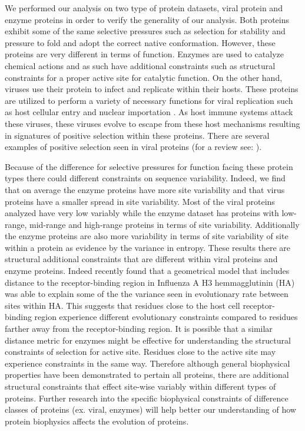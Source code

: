 \documentclass[12pt]{article}
\begin{document}
\indent We performed our analysis on two type of protein datasets, viral protein and enzyme proteins in order to verify the generality of our analysis. Both proteins exhibit some of the same selective pressures such as selection for stability and pressure to fold and adopt the correct native conformation. However, these proteins are very different in terms of function. Enzymes are used to catalyze chemical actions and as such have additional constraints such as structural constraints for a proper active site for catalytic function.  On the other hand, viruses use their protein to infect and replicate within their hosts. These proteins are utilized to perform a variety of necessary functions for viral replication such as host cellular entry \citep{Radoshitskyetal2007, Allisonetal2014} and nuclear importation \citep{Schalleretal2014}. As host immune systems attack these viruses, these viruses evolve to escape from these host mechanisms resulting in signatures of positive selection within these proteins. There are several examples of positive selection seen in viral proteins (for a review see: \cite{Sironietal2015}). 

\indent Because of the difference for selective pressures for function facing these protein types there could different constraints on sequence variability. Indeed, we find that on average the enzyme proteins have more site variability and that virus proteins have a smaller spread in site variability. Most of the viral proteins analyzed have very low variably while the enzyme dataset has proteins with low-range, mid-range and high-range proteins in terms of site variability. Additionally the enzyme proteins are also more variability in terms of site variability of site within a protein as evidence by the variance in entropy. These results there are structural additional constraints that are different within viral proteins and enzyme proteins. Indeed recently \cite{Meyeretal2015} found that a geometrical model that includes distance to the receptor-binding region in Influenza A H3 hemmagglutinin (HA) was able to explain some of the the variance seen in evolutionary rate between sites within HA. This suggests that residues close to the host cell receptor-binding region experience different evolutionary constraints compared to residues farther away from the receptor-binding region. It is possible that a similar  distance metric for enzymes might be effective for understanding the structural constraints of selection for active site. Residues close to the active site may experience constraints in the same way. Therefore although general biophysical properties have been demonstrated to pertain all proteins, there are additional structural constraints that effect site-wise variably within different types of proteins. Further research into the specific biophysical constraints of difference classes of proteins (ex. viral, enzymes) will help better our understanding of how protein biophysics affects the evolution of proteins.
\end{document}
